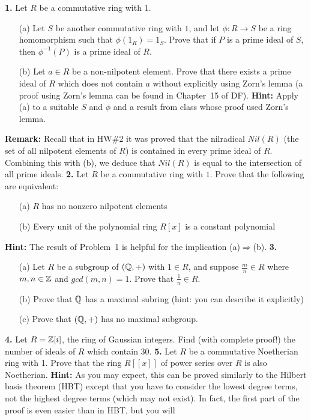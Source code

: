 \documentclass[12pt]{amsart}
\begin{document}
\skv
{\bf 1.} Let $R$ be a commutative ring with $1$.
\begin{itemize}
\item[(a)] Let $S$ be another commutative ring with $1$, and let $\phi:R\to S$ be a ring homomorphism such that $\phi(1_R)=1_S$. Prove that
if $P$ is a prime ideal of $S$, then $\phi^{-1}(P)$ is a prime ideal of $R$.
\item[(b)] Let $a\in R$ be a non-nilpotent element. Prove that there exists a prime ideal of $R$ which does not contain $a$ without explicitly using Zorn's lemma (a proof using Zorn's lemma can be found in Chapter~15 of DF). {\bf Hint:} Apply (a) to a suitable $S$ and $\phi$
and a result from class whose proof used Zorn's lemma.
\end{itemize}
{\bf Remark:} Recall that in HW\#2 it was proved that the nilradical $Nil(R)$ (the set of all nilpotent elements of $R$) is contained in every prime ideal of $R$. Combining this with (b), we deduce that $Nil(R)$ is equal to the intersection of all prime ideals.
\skv
{\bf 2.} Let $R$ be a commutative ring with $1$. Prove that the following are equivalent:
\begin{itemize}
\item[(a)] $R$ has no nonzero nilpotent elements
\item[(b)] Every unit of the polynomial ring $R[x]$ is a constant polynomial
\end{itemize}
{\bf Hint:} The result of Problem~1 is helpful for the implication (a)$\Rightarrow$(b).
\skv
{\bf 3.}
\begin{itemize}
\item[(a)] Let $R$ be a subgroup of $({\mathbb Q},+)$ with $1\in R$, and suppose $\frac{m}{n}\in R$ where $m,n\in{\mathbb Z}$ and $gcd(m,n)=1$. Prove that $\frac{1}{n}\in R$.
\item[(b)] Prove that ${\mathbb Q}$ has a maximal subring (hint: you can describe it explicitly)
\item[(c)] Prove that $({\mathbb Q},+)$ has no maximal subgroup.
\end{itemize}
{\bf 4.} Let $R={\mathbb Z}[i]$, the ring of Gaussian integers. Find (with complete proof!) the number of ideals of $R$ which contain $30$.
\skv
{\bf 5.} Let $R$ be a commutative Noetherian ring with 1. Prove that
the ring $R[[x]]$ of power series over $R$ is also Noetherian.
{\bf Hint:} As you may expect, this can be proved similarly 
to the Hilbert basis theorem (HBT) except that you have to consider
the lowest degree terms, not the highest degree terms (which may not exist). 
In fact, the first part of the proof is even easier than in HBT, but you will 
\end{document}
